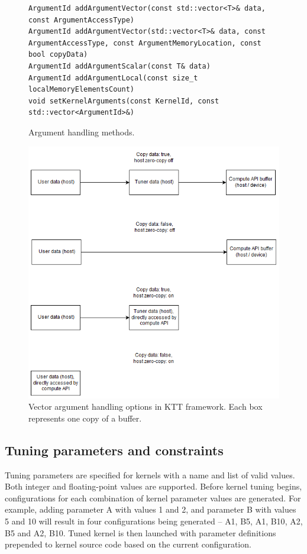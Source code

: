 \documentclass
[
    digital, %
    oneside, %
    table, %
    nolof, %
    nolot, %
    nocover %
]{fithesis3}
\begin{document}
\begin{figure}
\begin{lstlisting}
ArgumentId addArgumentVector(const std::vector<T>& data, const ArgumentAccessType)
ArgumentId addArgumentVector(std::vector<T>& data, const ArgumentAccessType, const ArgumentMemoryLocation, const bool copyData)
ArgumentId addArgumentScalar(const T& data)
ArgumentId addArgumentLocal(const size_t localMemoryElementsCount)
void setKernelArguments(const KernelId, const std::vector<ArgumentId>&)
\end{lstlisting}
\caption{Argument handling methods.}
\label{ktt-argument-methods}
\end{figure}

\begin{figure}
\begin{center}
\includegraphics[width=125mm]{resources/ktt_buffer_diagram.png}
\end{center}
\caption{Vector argument handling options in KTT framework. Each box represents one copy of a buffer.}
\label{ktt-buffer-diagram}
\end{figure}

\subsection{Tuning parameters and constraints}
Tuning parameters are specified for kernels with a name and list of valid values. Both integer and floating-point values are supported. Before kernel
tuning begins, configurations for each combination of kernel parameter values are generated. For example, adding parameter A with values 1 and 2, and
parameter B with values 5 and 10 will result in four configurations being generated -- {A1, B5}, {A1, B10}, {A2, B5} and {A2, B10}. Tuned kernel is
then launched with parameter definitions prepended to kernel source code based on the current configuration.
\end{document}
